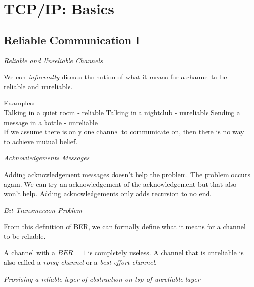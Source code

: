 \chapter{TCP/IP: Basics}


\section{Reliable Communication I}

\frmrule 

\textit{Reliable and Unreliable Channels}


We can \textit{informally} discuss the notion of what it means 
for a channel to be reliable and unreliable. 

Examples:\\
Talking in a quiet room - reliable
Talking in a nightclub - unreliable
Sending a message in a bottle - unreliable \\

If we assume there is only one channel to communicate on, 
then there is no way to achieve mutual belief. 

\frmrule 

\textit{Acknowledgements Messages}

Adding acknowledgement messages doesn't help the problem. 
The problem occurs again. We can try an acknowledgement 
of the acknowledgement but that also won't help. 
Adding acknowledgements only adds recursion to no end. 

\frmrule 

\textit{Bit Transmission Problem}





From this definition of BER, we can formally define what it means 
for a channel to be reliable. 



A channel with a $BER = 1$ is completely useless. 
A channel that is unreliable is also called a \textit{noisy channel} 
or a \textit{best-effort channel}. 

\frmrule 

\textit{Providing a reliable layer of abstraction on top of unreliable layer}

